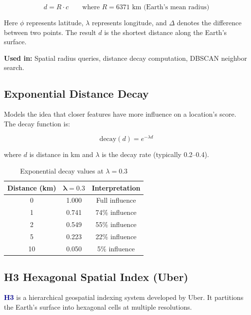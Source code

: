 \documentclass[12pt, a4paper]{article}
\newcommand{\concept}[1]{\textbf{\textcolor{darkblue}{#1}}}
\begin{document}
\begin{equation}
    d = R \cdot c \qquad \text{where } R = 6371 \text{ km (Earth's mean radius)}
\end{equation}

Here $\phi$ represents latitude, $\lambda$ represents longitude, and $\Delta$ denotes
the difference between two points. The result $d$ is the shortest distance along
the Earth's surface.

\textbf{Used in:} Spatial radius queries, distance decay computation, DBSCAN neighbor search.

\subsection{Exponential Distance Decay}

Models the idea that closer features have more influence on a location's score.
The decay function is:

\begin{equation}
    \text{decay}(d) = e^{-\lambda d}
\end{equation}

where $d$ is distance in km and $\lambda$ is the decay rate (typically 0.2--0.4).

\begin{table}[H]
\centering
\begin{tabular}{c c c}
    \toprule
    \textbf{Distance (km)} & $\boldsymbol{\lambda = 0.3}$ & \textbf{Interpretation} \\
    \midrule
    0   & 1.000 & Full influence \\
    1   & 0.741 & 74\% influence \\
    2   & 0.549 & 55\% influence \\
    5   & 0.223 & 22\% influence \\
    10  & 0.050 & 5\% influence \\
    \bottomrule
\end{tabular}
\caption{Exponential decay values at $\lambda = 0.3$}
\end{table}

\subsection{H3 Hexagonal Spatial Index (Uber)}

\concept{H3} is a hierarchical geospatial indexing system developed by Uber. It
partitions the Earth's surface into hexagonal cells at multiple resolutions.
\end{document}
